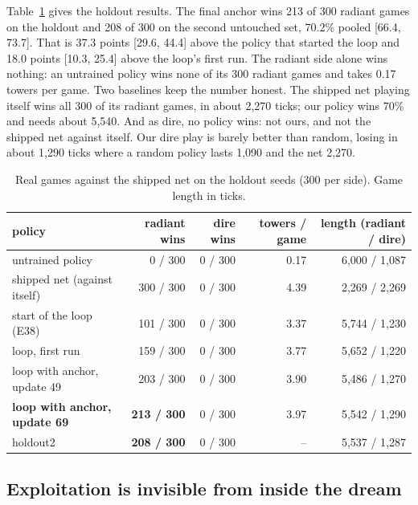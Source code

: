 \documentclass[11pt]{article}
\begin{document}
Table~\ref{tab:headline} gives the holdout results. The final anchor wins 213 of 300 radiant games on the holdout and 208 of 300 on the second untouched set, 70.2\% pooled [66.4, 73.7]. That is 37.3 points [29.6, 44.4] above the policy that started the loop and 18.0 points [10.3, 25.4] above the loop's first run. The radiant side alone wins nothing: an untrained policy wins none of its 300 radiant games and takes 0.17 towers per game. Two baselines keep the number honest. The shipped net playing itself wins all 300 of its radiant games, in about 2,270 ticks; our policy wins 70\% and needs about 5,540. And as dire, no policy wins: not ours, and not the shipped net against itself. Our dire play is barely better than random, losing in about 1,290 ticks where a random policy lasts 1,090 and the net 2,270.

\begin{table}[!htbp]
\centering\small
\caption{Real games against the shipped net on the holdout seeds (300 per side). Game length in ticks.}
\label{tab:headline}
\begin{tabular}{l r r r r}
\toprule
policy & radiant wins & dire wins & towers / game & length (radiant / dire) \\
\midrule
untrained policy & 0 / 300 & 0 / 300 & 0.17 & 6,000 / 1,087 \\
shipped net (against itself) & 300 / 300 & 0 / 300 & 4.39 & 2,269 / 2,269 \\
\midrule
start of the loop (E38) & 101 / 300 & 0 / 300 & 3.37 & 5,744 / 1,230 \\
loop, first run & 159 / 300 & 0 / 300 & 3.77 & 5,652 / 1,220 \\
loop with anchor, update 49 & 203 / 300 & 0 / 300 & 3.90 & 5,486 / 1,270 \\
\textbf{loop with anchor, update 69} & \textbf{213 / 300} & 0 / 300 & 3.97 & 5,542 / 1,290 \\
\quad holdout2 & \textbf{208 / 300} & 0 / 300 & -- & 5,537 / 1,287 \\
\bottomrule
\end{tabular}
\end{table}

\subsection{Exploitation is invisible from inside the dream}
\label{sec:collapse}
\end{document}
